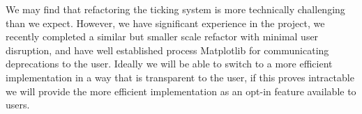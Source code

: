 \documentclass[12pt]{article}
\numberwithin{page}{section}
\begin{document}
We may find that refactoring the ticking system is more technically challenging
than we expect.  However, we have significant experience in the project, we
recently completed a similar but smaller scale refactor with minimal user
disruption, and have well established process Matplotlib for communicating
deprecations to the user.  Ideally we will be able to switch to a more
efficient implementation in a way that is transparent to the user, if this proves
intractable we will provide the more efficient implementation as an opt-in feature
available to users.

\end{document}

